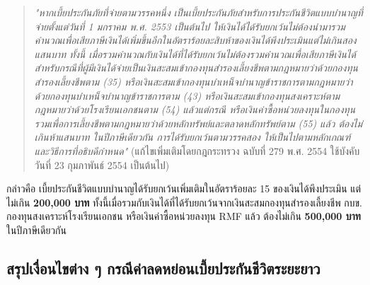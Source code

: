 \documentclass[12pt,a4paper]{article}
\newcommand{\hilight}[1]{\textbf{#1}}
\begin{document}
\begin{quote}
\textit{"หากเบี้ยประกันภัยที่จ่ายตามวรรคหนึ่ง เป็นเบี้ยประกันภัยสำหรับการประกันชีวิตแบบบำนาญที่จ่ายตั้งแต่วันที่ 1 มกราคม พ.ศ. 2553 เป็นต้นไป ให้เงินได้ได้รับยกเว้นไม่ต้องนำมารวมคำนวณเพื่อเสียภาษีเงินได้เพิ่มขึ้นอีกในอัตราร้อยละสิบห้าของเงินได้พึงประเมินแต่ไม่เกินสองแสนบาท ทั้งนี้ เมื่อรวมคำนวณกับเงินได้ที่ได้รับยกเว้นไม่ต้องรวมคำนวณเพื่อเสียภาษีเงินได้สำหรับกรณีที่ผู้มีเงินได้จ่ายเป็นเงินสะสมเข้ากองทุนสำรองเลี้ยงชีพตามกฎหมายว่าด้วยกองทุนสำรองเลี้ยงชีพตาม (35) หรือเงินสะสมเข้ากองทุนบำเหน็จบำนาญข้าราชการตามกฎหมายว่าด้วยกองทุนบำเหน็จบำนาญข้าราชการตาม (43) หรือเงินสะสมเข้ากองทุนสงเคราะห์ตามกฎหมายว่าด้วยโรงเรียนเอกชนตาม (54) แล้วแต่กรณี หรือเงินค่าซื้อหน่วยลงทุนในกองทุนรวมเพื่อการเลี้ยงชีพตามกฎหมายว่าด้วยหลักทรัพย์และตลาดหลักทรัพย์ตาม (55) แล้ว ต้องไม่เกินห้าแสนบาท ในปีภาษีเดียวกัน การได้รับยกเว้นตามวรรคสอง ให้เป็นไปตามหลักเกณฑ์และวิธีการที่อธิบดีกำหนด"} (แก้ไขเพิ่มเติมโดยกฎกระทรวง ฉบับที่ 279 พ.ศ. 2554 ใช้บังคับวันที่ 23 กุมภาพันธ์ 2554 เป็นต้นไป)
\end{quote}

กล่าวคือ เบี้ยประกันชีวิตแบบบำนาญได้รับยกเว้นเพิ่มเติมในอัตราร้อยละ 15 ของเงินได้พึงประเมิน แต่ไม่เกิน \hilight{200,000 บาท} ทั้งนี้เมื่อรวมกับเงินได้ที่ได้รับยกเว้นจากเงินสะสมกองทุนสำรองเลี้ยงชีพ กบข. กองทุนสงเคราะห์โรงเรียนเอกชน หรือเงินค่าซื้อหน่วยลงทุน RMF แล้ว ต้องไม่เกิน \hilight{500,000 บาท} ในปีภาษีเดียวกัน

\subsection*{สรุปเงื่อนไขต่าง ๆ กรณีค่าลดหย่อนเบี้ยประกันชีวิตระยะยาว}
\end{document}
